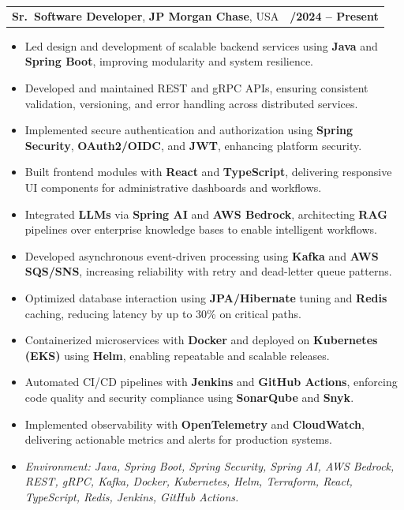 \documentclass[letterpaper,11pt]{article}
\makeatletter
\newcommand{\resumeItem}[1]{
  \item\footnotesize{
    {#1 \vspace{-2pt}}
  }
}
\newcommand{\resumeSubheading}[4]{
  \vspace{-2pt}\item
    \begin{tabular*}{1.0\textwidth}[t]{l@{\extracolsep{\fill}}r}
      \textbf{\fontsize{10pt}{14pt}\selectfont #3}, \textbf{\fontsize{10pt}{14pt}\selectfont #1}, \fontsize{10pt}{14pt}\selectfont #4 & \textbf{\fontsize{10pt}{14pt}\selectfont #2} \\
    \end{tabular*}\vspace{-7pt}
}
\newcommand{\resumeItemListStart}{\begin{itemize}[leftmargin=*]}
\newcommand{\resumeItemListEnd}{\end{itemize}\vspace{-5pt}}
\makeatother
\begin{document}
\resumeSubheading
{JP Morgan Chase}{09/2024 -- Present}
{Sr.\ Software Developer}{USA}
\resumeItemListStart
  \resumeItem{Led design and development of scalable backend services using \textbf{Java} and \textbf{Spring Boot}, improving modularity and system resilience.}
  \resumeItem{Developed and maintained REST and gRPC APIs, ensuring consistent validation, versioning, and error handling across distributed services.}
  \resumeItem{Implemented secure authentication and authorization using \textbf{Spring Security}, \textbf{OAuth2/OIDC}, and \textbf{JWT}, enhancing platform security.}
  \resumeItem{Built frontend modules with \textbf{React} and \textbf{TypeScript}, delivering responsive UI components for administrative dashboards and workflows.}
  \resumeItem{Integrated \textbf{LLMs} via \textbf{Spring AI} and \textbf{AWS Bedrock}, architecting \textbf{RAG} pipelines over enterprise knowledge bases to enable intelligent workflows.}
  \resumeItem{Developed asynchronous event-driven processing using \textbf{Kafka} and \textbf{AWS SQS/SNS}, increasing reliability with retry and dead-letter queue patterns.}
  \resumeItem{Optimized database interaction using \textbf{JPA/Hibernate} tuning and \textbf{Redis} caching, reducing latency by up to 30\% on critical paths.}
  \resumeItem{Containerized microservices with \textbf{Docker} and deployed on \textbf{Kubernetes (EKS)} using \textbf{Helm}, enabling repeatable and scalable releases.}
  \resumeItem{Automated CI/CD pipelines with \textbf{Jenkins} and \textbf{GitHub Actions}, enforcing code quality and security compliance using \textbf{SonarQube} and \textbf{Snyk}.}
  \resumeItem{Implemented observability with \textbf{OpenTelemetry} and \textbf{CloudWatch}, delivering actionable metrics and alerts for production systems.}
  \resumeItem{\textit{Environment: Java, Spring Boot, Spring Security, Spring AI, AWS Bedrock, REST, gRPC, Kafka, Docker, Kubernetes, Helm, Terraform, React, TypeScript, Redis, Jenkins, GitHub Actions.}}
\resumeItemListEnd
\end{document}

